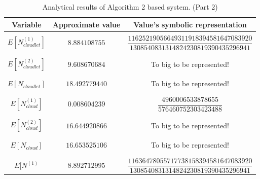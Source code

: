 \documentclass[10pt,a4paper]{article}
\begin{document}
\begin{table}[h!]
\caption{Analytical results of Algorithm 2 based system. (Part 2)}
\begin{adjustbox}{center=\textwidth}
	
     \begin{tabular}{c|c|c}
     \toprule
     \textbf{Variable} & \textbf{Approximate value} & \textbf{Value's symbolic representation} \\
     \toprule
	 
	 &&\\

$E[N^{(1)}_{cloudlet}]$ & $8.884108755$ & $\dfrac{11625219056649311918394581647083920}{1308540831314824230819390435296941}$ \\
     
     &&\\\hline &&\\
     
     $E[N^{(2)}_{cloudlet}]$ & $9.608670684$ & To big to be represented! \\
     
	 &&\\\hline &&\\
     
     $E[N_{cloudlet}]$ & $18.492779440$ & To big to be represented! \\     
     
	 &&\\\hline &&\\
     
     $E[N^{(1)}_{cloud}]$ & $0.008604239$ & $\dfrac{4960006533878655}{576460752303423488}$ \\

&&\\\hline &&\\

	 $E[N^{(2)}_{cloud}]$ & $16.644920866$ & To big to be represented! \\

	 &&\\\hline &&\\
	
	 $E[N_{cloud}]$ & $16.653525106$ & To big to be represented! \\

     &&\\\hline &&\\

     $E[N^{(1)}$ & $8.892712995$ & $\dfrac{11636478055717738158394581647083920}{1308540831314824230819390435296941}$ \\


\end{tabular}
\end{adjustbox}
\end{table}
\end{document}
